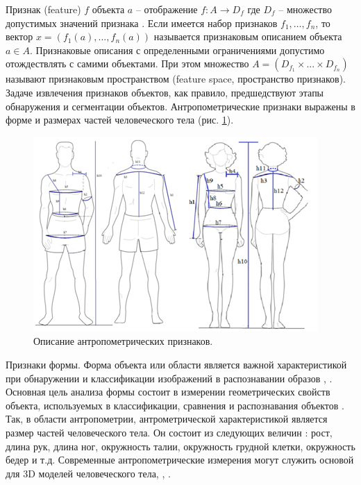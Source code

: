 Признак (feature)  $f$  объекта $a$ – отображение $f:A\rightarrow D_f$  где $D_f$ – множество допустимых значений признака \cite{Mecte2002}.  Если имеется набор признаков $f_1,…,f_n$, то вектор $x= \left(f_1\left(a\right), ..., f_n\left(a\right)\right)$ называется признаковым описанием объекта $a\in A$. Признаковые описания с определенными ограничениями допустимо отождествлять с самими объектами. При этом множество $A=\left(D_{f_1}\times ... \times D_{f_n}\right)$ называют признаковым пространством (feature space, пространство признаков). Задаче извлечения признаков объектов, как правило, предшедствуют этапы обнаружения и сегментации объектов. 
Антропометрические признаки выражены в форме и размерах частей человеческого тела (рис. \ref{img1}).
\begin{figure}[htb]
\centering
\includegraphics [scale=0.8] {images/h1.png}
\begin{center}
\caption{Описание антропометрических признаков.} \label{img1}
\end{center}
\end{figure}

Признаки формы. Форма объекта или области является важной характеристикой при обнаружении и классификации изображений в распознавании образов \cite{Jones2002}, \cite{Dubinskiy2003}. Основная цель анализа формы состоит в измерении геометрических свойств объекта, используемых в классификации, сравнения и распознавания объектов \cite{Kpalma2006}. Так, в области антропометрии, антрометрической характеристикой является размер частей человеческого тела. Он состоит из следующих величин \cite{urlclothes2015}: рост, длина рук, длина ног, окружность талии, окружность грудной клетки, окружность бедер и т.д. Современные антропометрические измерения могут служить основой для 3D моделей человеческого тела\cite{Toldo2009}, \cite{Ponce1989}, \cite{Zhang2001}.

